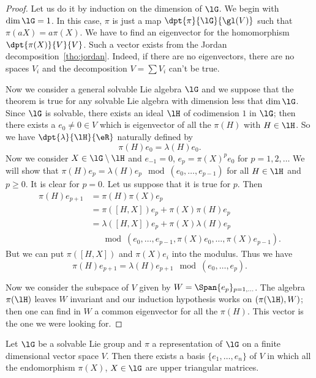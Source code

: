 \begin{proof}
	Let us do it by induction on the dimension of $\lG$. We begin with $\dim\lG=1$. In this case, $\pi$ is just a map $\dpt{\pi}{\lG}{\gl(V)}$ such that $\pi(aX)=a\pi(X)$. We have to find an eigenvector for the homomorphism $\dpt{\pi(X)}{V}{V}$. Such a vector exists  from the Jordan decomposition~\ref{tho:jordan}. Indeed, if there are no eigenvectors, there are no spaces $V_i$ and the decomposition $V=\sum V_i$ can't be true.

	Now we consider a general solvable Lie algebra $\lG$ and we suppose that the theorem is true for any solvable Lie algebra with dimension less that $\dim\lG$. Since $\lG$ is solvable, there exists an ideal $\lH$ of codimension $1$ in $\lG$; then there exists a $e_0\neq 0\in V$ which is eigenvector of all the $\pi(H)$ with $H\in\lH$. So we have $\dpt{\lambda}{\lH}{\eR}$ naturally defined by
	\[
		\pi(H)e_0=\lambda(H)e_0.
	\]
	Now we consider $X\in\lG\setminus\lH$ and $e_{-1}=0$, $e_p=\pi(X)^pe_0$ for $p=1,2,\ldots$ We will show that $\pi(H)e_p=\lambda(H)e_p\mod(e_0,\ldots,e_{p-1})$ for all $H\in\lH$ and $p\geq 0$. It is clear for $p=0$. Let us suppose that it is true for $p$. Then
	\begin{equation}
		\begin{split}
			\pi(H)e_{p+1}&=\pi(H)\pi(X)e_p\\
			&=\pi([H,X])e_p+\pi(X)\pi(H)e_p\\
			&=\lambda([H,X])e_p+\pi(X)\lambda(H)e_p\\
			&\quad\mod(e_0,\ldots,e_{p-1},\pi(X)e_0,\ldots,\pi(X)e_{p-1}).
		\end{split}
	\end{equation}
	But we can put $\pi([H,X])$ and $\pi(X)e_i$ into the modulus. Thus we have
	\[
		\pi(H)e_{p+1}=\lambda(H)e_{p+1}\mod(e_0,\ldots,e_p).
	\]

	Now we consider the subspace of $V$ given by $W=\Span\{e_p\}_{p=1,\ldots}$. The algebra $\pi(\lH)$ leaves $W$ invariant and our induction hypothesis works on $(\pi(\lH),W)$; then one can find in $W$ a common eigenvector for all the $\pi(H)$. This vector is the one we were looking for.
\end{proof}

\begin{corollary}
	Let $\lG$ be a solvable Lie group and $\pi$ a representation of $\lG$ on a finite dimensional vector space $V$. Then there exists a basis $\{e_1,\ldots,e_n\}$ of $V$ in which all the endomorphism $\pi(X)$, $X\in\lG$ are upper triangular matrices.
	\label{cor:de_Lie_Vu}
\end{corollary}

